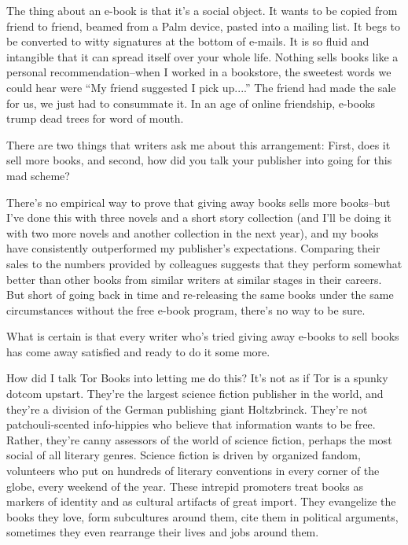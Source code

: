 The thing about an e-book is that it's a social object. It wants to
be copied from friend to friend, beamed from a Palm device, pasted
into a mailing list. It begs to be converted to witty signatures at
the bottom of e-mails. It is so fluid and intangible that it can
spread itself over your whole life. Nothing sells books like a
personal recommendation--when I worked in a bookstore, the sweetest
words we could hear were ``My friend suggested I pick up....'' The
friend had made the sale for us, we just had to consummate it. In
an age of online friendship, e-books trump dead trees for word of
mouth.

There are two things that writers ask me about this arrangement:
First, does it sell more books, and second, how did you talk your
publisher into going for this mad scheme?

There's no empirical way to prove that giving away books sells more
books--but I've done this with three novels and a short story
collection (and I'll be doing it with two more novels and another
collection in the next year), and my books have consistently
outperformed my publisher's expectations. Comparing their sales to
the numbers provided by colleagues suggests that they perform
somewhat better than other books from similar writers at similar
stages in their careers. But short of going back in time and
re-releasing the same books under the same circumstances without
the free e-book program, there's no way to be sure.

What is certain is that every writer who's tried giving away
e-books to sell books has come away satisfied and ready to do it
some more.

How did I talk Tor Books into letting me do this? It's not as if
Tor is a spunky dotcom upstart. They're the largest science fiction
publisher in the world, and they're a division of the German
publishing giant Holtzbrinck. They're not patchouli-scented
info-hippies who believe that information wants to be free. Rather,
they're canny assessors of the world of science fiction, perhaps
the most social of all literary genres. Science fiction is driven
by organized fandom, volunteers who put on hundreds of literary
conventions in every corner of the globe, every weekend of the
year. These intrepid promoters treat books as markers of identity
and as cultural artifacts of great import. They evangelize the
books they love, form subcultures around them, cite them in
political arguments, sometimes they even rearrange their lives and
jobs around them.

